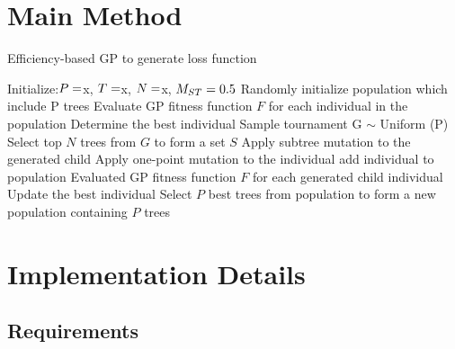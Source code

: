 \begin{ZhChapter}

\section{Main Method}

\begin{algorithm}
    \caption{Efficiency-based GP to generate loss function}\label{alg:cap}
    \begin{algorithmic}
        \State Initialize:$P = \space $x, $T =\space $x, $N = \space $x, $M_{ST} = \space0.5$
        \State Randomly initialize population which include P trees
        \State Evaluate GP fitness function $F$ for each individual in the population
        \State Determine the best individual
        \State Sample tournament G $\sim$ Uniform (P)
        \State Select top $N$ trees from $G$ to form a set $S$
        \State Apply subtree mutation to the generated child
        \Else
        \State Apply one-point mutation to the individual
        \EndIf
        \State add individual to population
        \EndIf
        \EndFor
        \State Evaluated GP fitness function $F$ for each generated child individual
        \State Update the best individual
        \State Select $P$ best trees from population to form a new population containing $P$ trees
        \EndWhile
    \end{algorithmic}
\end{algorithm}

\section{Implementation Details}

\subsection{Requirements}


\end{ZhChapter}
